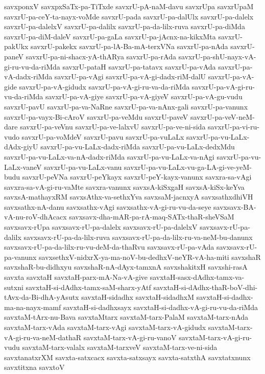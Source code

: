 {savxponxV
savxpxSaTx-pa-TiTxde
savxrU-pA-naM-davu
savxrUpa
savxrUpaM
savxrU-pa-ceY-ta-nayx-voMde
savxrU-pada
savxrU-pa-dalUlx
savxrU-pa-dalelx
savxrU-pa-dalelxV
savxrU-pa-dalilx
savxrU-pa-da-lilx-ruva
savxrU-pa-diMda
savxrU-pa-diM-daleV
savxrU-pa-gaLa
savxrU-pa-jAcnx-na-kikxMta
savxrU-pakUkx
savxrU-pakekx
savxrU-pa-lA-Ba-mA-terxVNa
savxrU-pa-nAda
savxrU-paneV
savxrU-pa-ni-shacx-yA-thARya
savxrU-pa-rAda
savxrU-pa-shU-nayx-vA-gi-ru-vu-da-riMda
savxrU-pataH
savxrU-pa-tatavx
savxrU-pa-vAda
savxrU-pa-vA-dadx-riMda
savxrU-pa-vAgi
savxrU-pa-vA-gi-dadx-riM-dalU
savxrU-pa-vA-gide
savxrU-pa-vA-gidudx
savxrU-pa-vA-gi-ru-va-da-riMda
savxrU-pa-vA-gi-ru-vu-da-riMda
savxrU-pa-vA-giye
savxrU-pa-vA-giyeV
savxrU-pa-vA-gu-vudu
savxrU-pavU
savxrU-pa-va-NaRne
savxrU-pa-va-nAnx-gali
savxrU-pa-vanunx
savxrU-pa-vayx-Bi-cAroV
savxrU-pa-veMdu
savxrU-paveV
savxrU-pa-veV-neM-dare
savxrU-pa-veVnu
savxrU-pa-ve-lalxvU
savxrU-pa-ve-ni-sida
savxrU-pa-vi-ru-vudo
savxrU-pa-voMdeV
savxrU-pavu
savxrU-pa-vuLaLx
savxrU-pa-vu-LaLx-dAdx-giyU
savxrU-pa-vu-LaLx-dadx-riMda
savxrU-pa-vu-LaLx-dedxMdu
savxrU-pa-vu-LaLx-va-nA-dadx-riMda
savxrU-pa-vu-LaLx-va-nAgi
savxrU-pa-vu-LaLx-vaneV
savxrU-pa-vu-LaLx-vanu
savxrU-pa-vu-LaLx-vu-ga-LA-gi-ve-yeM-budu
savxrU-peVNa
savxrU-peYkayx
savxrU-peY-kayx-vanunx
savxra-sa-vAgi
savxra-sa-vA-gi-ru-vaMte
savxra-vanunx
savxsA-kiSxgaH
savxsA-kiSx-keYva
savxsA-mathayxRM
savxsAthx-va-sethxYva
savxsaM-jacnxyA
savxsathxdhiVH
savxsathx-nA-danu
savxsathx-vAgi
savxsathx-vA-gi-ru-vu-da-seye
savxsavx-BA-vA-nu-roV-dhAcacx
savxsavx-dha-mAR-pa-rA-maq-SATx-thaR-sheVSaM
savxsavx-rUpa
savxsavx-rU-pa-dalelx
savxsavx-rU-pa-dalelxV
savxsavx-rU-pa-dalilx
savxsavx-rU-pa-da-lilx-ruva
savxsavx-rU-pa-da-lilx-ru-va-neM-bu-danunx
savxsavx-rU-pa-da-lilx-ru-vu-deM-da-thaRvu
savxsavx-rU-pa-vAda
savxsavx-rU-pa-vanunx
savxsethxV-nidxrX-ya-ma-noV-bu-dedhxV-neYR-vA-ha-miti
savxshaR
savxshaR-bu-didhxyu
savxshaR-nA-dAyx-tamxnA
savxshakitxH
savxshi-rasA
savxta
savxtaH
savxtaH-parx-mA-Na-vA-give
savxtaH-sasx-dAdhx-tamx-va-sutxni
savxtaH-si-dAdhx-tamx-saM-sharx-yAtf
savxtaH-si-dAdhx-thaR-boV-dhi-tAvx-da-Bi-dhA-yAsutx
savxtaH-sidadhx
savxtaH-sidadhxM
savxtaH-si-dadhx-ma-na-nayx-mamf
savxtaH-si-dadhxsayx
savxtaH-si-dadhx-vA-gi-ru-vu-da-riMda
savxtaM-tArx-nu-Bava
savxtaMtarx
savxtaM-tarx-PalaM
savxtaM-tarx-nAda
savxtaM-tarx-vAda
savxtaM-tarx-vAgi
savxtaM-tarx-vA-gidudx
savxtaM-tarx-vA-gi-ru-va-neM-dathaR
savxtaM-tarx-vA-gi-ru-vanoV
savxtaM-tarx-vA-gi-ru-vudu
savxtaM-tarx-valalx
savxtaM-tarxveV
savxtaM-tarx-ve-ni-sida
savxtanatxrXM
savxta-satxcacx
savxta-satxsayx
savxta-satxthA
savxtatxnunx
savxtitxna
savxtoV
}
